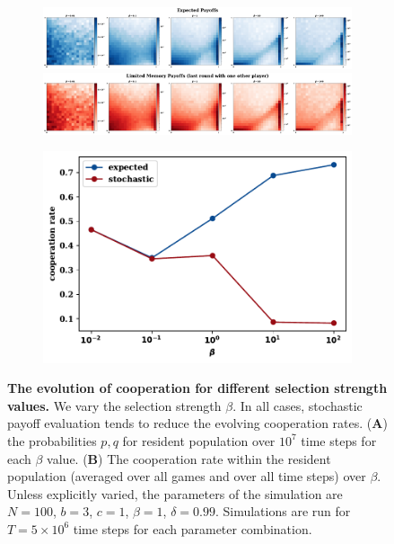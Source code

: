 \documentclass[11pt]{article}
\theoremstyle{plainCl1}
\theoremstyle{plainCl2}
\begin{document}
\begin{figure}[!htbp]
  \centering
  \begin{subfigure}{.65\textwidth}
    \centering
    \includegraphics[width=\textwidth]{static/expected_for_selection_strenght.pdf}
    \includegraphics[width=\textwidth]{static/stochastic_for_selection_strenght.pdf}
  \end{subfigure}%
  \begin{subfigure}{.35\textwidth}
    \vspace{.3cm}
    \includegraphics[width=\textwidth]{static/cooperation_rate_over_betas.pdf}
  \end{subfigure}
\caption{{\bf The evolution of cooperation for different selection strength values.} 
We vary the selection strength $\beta$. In all cases, stochastic payoff
evaluation tends to reduce the evolving cooperation rates. ({\bf A}) the
probabilities \(p, q\) for resident population over \(10^7\) time steps for each
\(\beta\) value. ({\bf B}) The cooperation rate within the resident population
(averaged over all games and over all time steps) over \(\beta\).
Unless explicitly varied, the parameters of the simulation are $N\!=\!100$,
$b\!=\!3$, $c\!=\!1$, $\beta\!=\!1$, $\delta\!=\!0.99$. Simulations are run for
$T\!=\!5\times 10^6$ time steps for each parameter
combination.}\label{fig:cooperation_rate_over_betas}
\end{figure}
\end{document}
